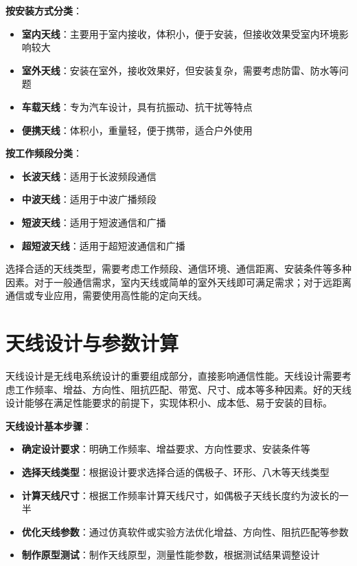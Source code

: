 \documentclass[12pt,UTF8]{ctexbook}
\begin{document}
\textbf{按安装方式分类}：
\begin{itemize}[leftmargin=3.5em]
    \item \textbf{室内天线}：主要用于室内接收，体积小，便于安装，但接收效果受室内环境影响较大
    \item \textbf{室外天线}：安装在室外，接收效果好，但安装复杂，需要考虑防雷、防水等问题
    \item \textbf{车载天线}：专为汽车设计，具有抗振动、抗干扰等特点
    \item \textbf{便携天线}：体积小，重量轻，便于携带，适合户外使用
\end{itemize}

\textbf{按工作频段分类}：
\begin{itemize}[leftmargin=3.5em]
    \item \textbf{长波天线}：适用于长波频段通信
    \item \textbf{中波天线}：适用于中波广播频段
    \item \textbf{短波天线}：适用于短波通信和广播
    \item \textbf{超短波天线}：适用于超短波通信和广播
\end{itemize}

选择合适的天线类型，需要考虑工作频段、通信环境、通信距离、安装条件等多种因素。对于一般通信需求，室内天线或简单的室外天线即可满足需求；对于远距离通信或专业应用，需要使用高性能的定向天线。

\section{天线设计与参数计算}

天线设计是无线电系统设计的重要组成部分，直接影响通信性能。天线设计需要考虑工作频率、增益、方向性、阻抗匹配、带宽、尺寸、成本等多种因素。好的天线设计能够在满足性能要求的前提下，实现体积小、成本低、易于安装的目标。

\textbf{天线设计基本步骤}：
\begin{itemize}[leftmargin=3.5em]
    \item \textbf{确定设计要求}：明确工作频率、增益要求、方向性要求、安装条件等
    \item \textbf{选择天线类型}：根据设计要求选择合适的偶极子、环形、八木等天线类型
    \item \textbf{计算天线尺寸}：根据工作频率计算天线尺寸，如偶极子天线长度约为波长的一半
    \item \textbf{优化天线参数}：通过仿真软件或实验方法优化增益、方向性、阻抗匹配等参数
    \item \textbf{制作原型测试}：制作天线原型，测量性能参数，根据测试结果调整设计
\end{itemize}
\end{document}
